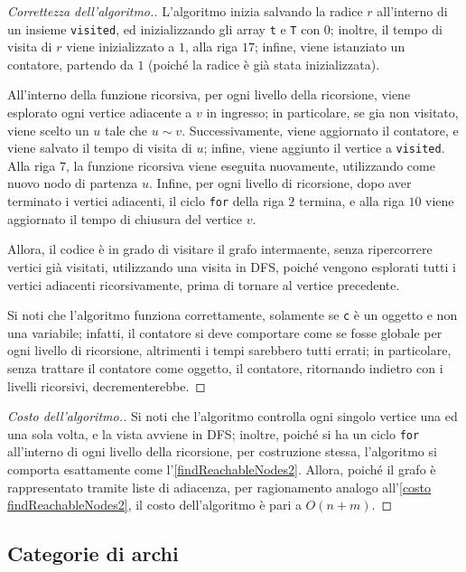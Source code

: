 \documentclass[a4paper, 12pt]{report}
\begin{document}
    \begin{proof}[Correttezza dell'algoritmo.]
        L'algoritmo inizia salvando la radice $r$ all'interno di un insieme \texttt{visited}, ed inizializzando gli array \texttt{t} e \texttt{T} con $0$; inoltre, il tempo di visita di $r$ viene inizializzato a $1$, alla riga $17$; infine, viene istanziato un contatore, partendo da $1$ (poiché la radice è già stata inizializzata).

        All'interno della funzione ricorsiva, per ogni livello della ricorsione, viene esplorato ogni vertice adiacente a $v$ in ingresso; in particolare, se gia non visitato, viene scelto un $u$ tale che $u \sim v$. Successivamente, viene aggiornato il contatore, e viene salvato il tempo di visita di $u$; infine, viene aggiunto il vertice a \texttt{visited}. Alla riga $7$, la funzione ricorsiva viene eseguita nuovamente, utilizzando come nuovo nodo di partenza $u$. Infine, per ogni livello di ricorsione, dopo aver terminato i vertici adiacenti, il ciclo \texttt{for} della riga $2$ termina, e alla riga $10$ viene aggiornato il tempo di chiusura del vertice $v$.

        Allora, il codice è in grado di visitare il grafo intermaente, senza ripercorrere vertici già visitati, utilizzando una visita in DFS, poiché vengono esplorati tutti i vertici adiacenti ricorsivamente, prima di tornare al vertice precedente.

        Si noti che l'algoritmo funziona correttamente, solamente se \texttt{c} è un oggetto e non una variabile; infatti, il contatore si deve comportare come se fosse globale per ogni livello di ricorsione, altrimenti i tempi sarebbero tutti errati; in particolare, senza trattare il contatore come oggetto, il contatore, ritornando indietro con i livelli ricorsivi, decrementerebbe.
    \end{proof}

    \begin{proof}[Costo dell'algoritmo.]
        Si noti che l'algoritmo controlla ogni singolo vertice una ed una sola volta, e la vista avviene in DFS; inoltre, poiché si ha un ciclo \texttt{for} all'interno di ogni livello della ricorsione, per costruzione stessa, l'algoritmo si comporta esattamente come l'\cref{findReachableNodes2}. Allora, poiché il grafo è rappresentato tramite liste di adiacenza, per ragionamento analogo all'\cref{costo findReachableNodes2}, il costo dell'algoritmo è pari a $O(n + m)$.
    \end{proof}

    \subsection{Categorie di archi}
\end{document}
